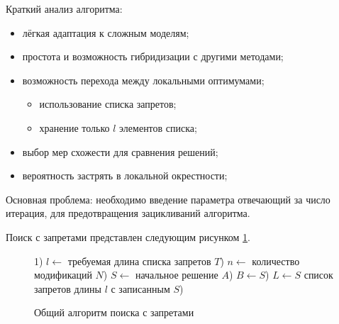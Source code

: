 Краткий анализ алгоритма:
\begin{itemize}
    \item лёгкая адаптация к сложным моделям;
    \item простота и возможность гибридизации с другими методами;
    \item возможность перехода между локальными оптимумами;
    \begin{itemize}
        \item использование списка запретов;
        \item хранение только \( l \) элементов списка;
    \end{itemize}
    \item выбор мер схожести для сравнения решений;
    \item вероятность застрять в локальной окрестности;
\end{itemize}

Основная проблема: необходимо введение параметра отвечающий за число итерация, для предотвращения 
зацикливаний алгоритма.

Поиск с запретами представлен следующим рисунком \ref{alg:tabu-search}.

\clearpage

\begin{figure}[ht!]
    \begin{algorithm}[H]
        1) \( l \leftarrow \) требуемая длина списка запретов \( T \)) \( n \leftarrow \) количество модификаций \( N \)) \( S \leftarrow \) начальное решение \( A \)) \( B \leftarrow S \)) \( L \leftarrow { S } \) список запретов длины \( l \) с записанным \( S \)) 
    \end{algorithm}
    \vspace*{-1.5em}
    \caption{Общий алгоритм поиска с запретами}
    \label{alg:tabu-search}
\end{figure}

